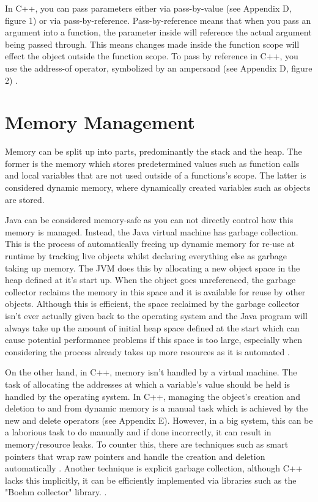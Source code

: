 \documentclass[]{report}
\begin{document}
In C++, you can pass parameters either via pass-by-value (see Appendix D, figure 1) or via pass-by-reference. Pass-by-reference means that when you pass an argument into a function, the parameter inside will reference the actual argument being passed through. This means changes made inside the function scope will effect the object outside the function scope. To pass by reference in C++, you use the address-of operator, symbolized by an ampersand (see Appendix D, figure 2) \cite{ParametersC++}.

\section{Memory Management}

Memory can be split up into parts, predominantly the stack and the heap. The former is the memory which stores predetermined values such as function calls and local variables that are not used outside of a functions's scope. The latter is considered dynamic memory, where dynamically created variables such as objects are stored.

Java can be considered memory-safe as you can not directly control how this memory is managed. Instead, the Java virtual machine has garbage collection. This is the process of automatically freeing up dynamic memory for re-use at runtime by tracking live objects whilst declaring everything else as garbage taking up memory. The JVM does this by allocating a new object space in the heap defined at it's start up. When the object goes unreferenced, the garbage collector reclaims the memory in this space and it is available for reuse by other objects. Although this is efficient, the space reclaimed by the garbage collector isn't ever actually given back to the operating system and the Java program will always take up the amount of initial heap space defined at the start which can cause potential performance problems if this space is too large, especially when considering the process already takes up more resources as it is automated \cite{MemoryJava}.

On the other hand, in C++, memory isn't handled by a virtual machine. The task of allocating the addresses at which a variable's value should be held is handled by the operating system. In C++, managing the object's creation and deletion to and from dynamic memory is a manual task which is achieved by the new and delete operators (see Appendix E). However, in a big system, this can be a laborious task to do manually and if done incorrectly, it can result in memory/resource leaks. To counter this, there are techniques such as smart pointers that wrap raw pointers and handle the creation and deletion automatically \cite{Smart Pointers}. Another technique is explicit garbage collection, although C++ lacks this implicitly, it can be efficiently implemented via libraries such as the "Boehm collector" library. \cite{Boehm}. 
\end{document}
